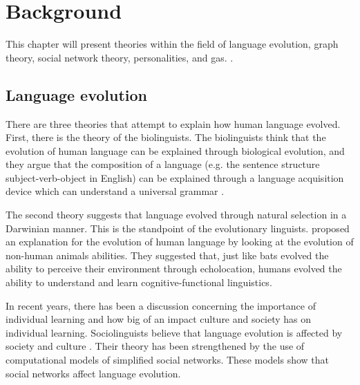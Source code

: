 \acresetall
\chapter{Background}
This chapter will present theories within the field of language evolution, graph theory, social network theory, personalities, and \acp{ga}.
.

\section{Language evolution}
There are three theories that attempt to explain how human language evolved. First, there is the theory of the biolinguists. The biolinguists think that the evolution of human language can be explained through biological evolution, and they argue that the composition of a language (e.g. the sentence structure subject-verb-object in English) can be explained through a language acquisition device which can understand a universal grammar \citep{chomsky1965some}.

The second theory suggests that language evolved through natural selection in a Darwinian manner. This is the standpoint of the evolutionary linguists. \citet{pinker1994regular} proposed an explanation for the evolution of human language by looking at the evolution of non-human animals abilities. They suggested that, just like bats evolved the ability to perceive their environment through echolocation, humans evolved the ability to understand and learn cognitive-functional linguistics.

In recent years, there has been a discussion concerning the importance of individual learning and how big of an impact culture and society has on individual learning. Sociolinguists believe that language evolution is affected by society and culture \citep{tomasello2003makes}. Their theory has been strengthened by the use of computational models of simplified social networks. These models show that social networks affect language evolution.

